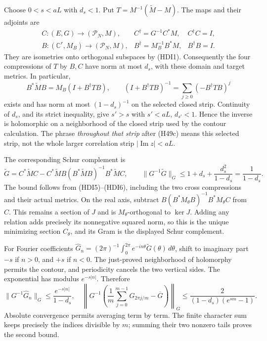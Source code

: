 \documentclass{article}
\begin{document}
Choose \(0<s<aL\) with \(d_s<1\). Put
\(T=M^{-1}(\widetilde M-M)\). The maps and their adjoints are
\[
 \begin{array}{lll}
 C:(E,G)\to(\mathcal P_N,M),&
 C^\dagger=G^{-1}C^*M,&C^\dagger C=I,\\
 B:(\mathbb C^r,M_B)\to(\mathcal P_N,M),&
 B^\dagger=M_B^{-1}B^*M,&B^\dagger B=I.
 \end{array}
 \tag{HDI5}
\]
They are isometries onto orthogonal subspaces by (HDI1).
Consequently the four compressions of \(T\) by \(B,C\) have norm
at most \(d_s\), with these domain and target metrics. In particular,
\[
 B^*\widetilde M B=M_B(I+B^\dagger TB),\qquad
 (I+B^\dagger TB)^{-1}=\sum_{j\ge0}(-B^\dagger TB)^j
 \tag{HDI6}
\]
exists and has norm at most \((1-d_s)^{-1}\) on the selected
closed strip. Continuity of \(d_s\), and its strict inequality,
give \(s'>s\) with \(s'<aL\), \(d_{s'}<1\). Hence the inverse is
holomorphic on a neighborhood of the closed strip used by the
contour calculation. The phrase \emph{throughout that strip}
after (H49c) means this selected strip, not the whole larger
correlation strip \(|\operatorname{Im}z|<aL\).

The corresponding Schur complement is
\[
 \widetilde G=C^*\widetilde M C-
 C^*\widetilde M B(B^*\widetilde M B)^{-1}B^*\widetilde M C,
 \qquad
 \|G^{-1}\widetilde G\|_G
 \le1+d_s+\frac{d_s^2}{1-d_s}=\frac1{1-d_s}.
 \tag{HDI7}
\]
The bound follows from (HDI5)--(HDI6), including the two cross
compressions and their actual metrics. On the real axis, subtract
\(B(B^*M_\theta B)^{-1}B^*M_\theta C\) from \(C\). This remains
a section of \(J\) and is \(M_\theta\)-orthogonal to \(\ker J\).
Adding any relation adds precisely its nonnegative squared norm,
so this is the unique minimizing section \(C_\theta\), and its
Gram is the displayed Schur complement.

For Fourier coefficients
\(\widehat G_n=(2\pi)^{-1}\int_0^{2\pi}e^{-in\theta}
\widetilde G(\theta)\,d\theta\), shift to imaginary part \(-s\)
if \(n>0\), and \(+s\) if \(n<0\). The just-proved neighborhood
of holomorphy permits the contour, and periodicity cancels the
two vertical sides. The exponential has modulus \(e^{-s|n|}\).
Therefore
\[
 \|G^{-1}\widehat G_n\|_G\le\frac{e^{-s|n|}}{1-d_s},\quad
 \left\|G^{-1}\left(\frac1m\sum_{j=0}^{m-1}G_{2\pi j/m}
 -\overline G\right)\right\|_G
 \le\frac{2}{(1-d_s)(e^{sm}-1)}.
 \tag{HDI8}
\]
Absolute convergence permits averaging term by term.
The finite character sum keeps precisely the indices divisible
by \(m\); summing their two nonzero tails proves the second bound.
\end{document}
